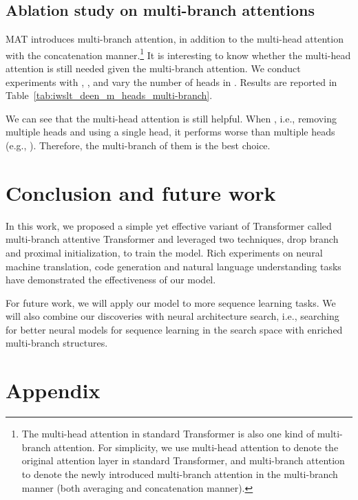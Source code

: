 \documentclass{article}
\begin{document}
\subsection{Ablation study on multi-branch attentions}
MAT introduces multi-branch attention, in addition to the multi-head attention with the concatenation manner.\footnote{The multi-head attention in standard Transformer is also one kind of multi-branch attention. For simplicity, we use multi-head attention to denote the original attention layer in standard Transformer, and multi-branch attention to denote the newly introduced multi-branch attention in the  multi-branch manner (both averaging and concatenation manner).} It is interesting to know whether the multi-head attention is still needed given the multi-branch attention. We conduct experiments with , ,  and vary the number of heads  in . Results are reported in Table~\ref{tab:iwslt_deen_m_heads_multi-branch}.






We can see that the multi-head attention is still helpful. When , i.e., removing multiple heads and using a single head, it performs worse than multiple heads (e.g., ). Therefore, the multi-branch of them is the best choice.





\section{Conclusion and future work}
In this work, we proposed a simple yet effective variant of Transformer called multi-branch attentive Transformer and leveraged two techniques, drop branch and proximal initialization, to train the model. Rich experiments on neural machine translation, code generation and natural language understanding tasks have demonstrated the effectiveness of our model. 

For future work, we will apply our model to more sequence learning tasks. We will also combine our discoveries with neural architecture search, i.e., searching for better neural models for sequence learning in the search space with enriched multi-branch structures.




 





\appendix

\section*{Appendix}
\end{document}
